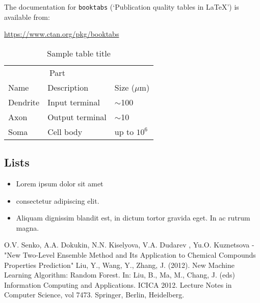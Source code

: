 \documentclass{article}
\begin{document}
The documentation for \verb+booktabs+ (`Publication quality tables in LaTeX') is available from:
\begin{center}
	\url{https://www.ctan.org/pkg/booktabs}
\end{center}


\begin{table}
	\caption{Sample table title}
	\centering
	\begin{tabular}{lll}
		\toprule
		\multicolumn{2}{c}{Part}                   \\
		\cmidrule(r){1-2}
		Name     & Description     & Size ($\mu$m) \\
		\midrule
		Dendrite & Input terminal  & $\sim$100     \\
		Axon     & Output terminal & $\sim$10      \\
		Soma     & Cell body       & up to $10^6$  \\
		\bottomrule
	\end{tabular}
	\label{tab:table}
\end{table}

\subsection{Lists}
\begin{itemize}
	\item Lorem ipsum dolor sit amet
	\item consectetur adipiscing elit.
	\item Aliquam dignissim blandit est, in dictum tortor gravida eget. In ac rutrum magna.
\end{itemize}


\newpage



\begin{thebibliography}{}
	 O.V. Senko, A.A. Dokukin, N.N. Kiselyova, V.A. Dudarev
	, Yu.O. Kuznetsova - "New Two-Level Ensemble Method and Its Application to
	Chemical Compounds Properties Prediction"
	 Liu, Y., Wang, Y., Zhang, J. (2012). New Machine Learning Algorithm: Random Forest. In: Liu, B., Ma, M., Chang, J. (eds) Information Computing and Applications. ICICA 2012. Lecture Notes in Computer Science, vol 7473. Springer, Berlin, Heidelberg.
\end{thebibliography}
\end{document}
